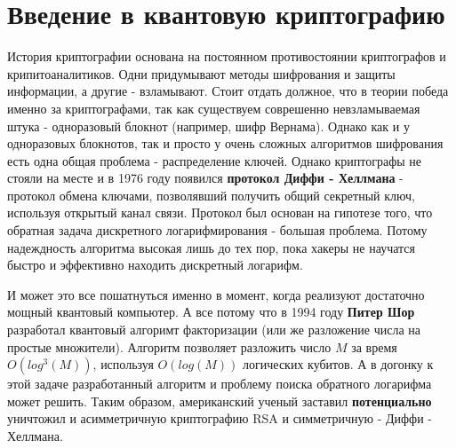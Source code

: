 
\section{Введение в квантовую криптографию}

История криптографии основана на постоянном противостоянии криптографов и крипитоаналитиков. Одни придумывают методы шифрования и защиты информации, а другие - взламывают. 
Стоит отдать должное, что в теории победа именно за криптографами, так как существуем соврешенно невзламываемая штука - одноразовый блокнот (например, шифр Вернама). 
Однако как и у одноразовых блокнотов, так и просто у очень сложных алгоритмов шифрования есть одна общая проблема - распределение ключей.
Однако криптографы не стояли на месте и в 1976 году появился \textbf{протокол Диффи - Хеллмана} -  протокол обмена ключами, позволявший получить общий секретный ключ, используя открытый канал связи. 
Протокол был основан на гипотезе того, что обратная задача дискретного логарифмирования - большая проблема. Потому надеждность алгоритма высокая лишь до тех пор, пока хакеры не научатся быстро и эффективно находить дискретный логарифм.

И может это все пошатнуться именно в момент, когда реализуют достаточно мощный квантовый компьютер. А все потому что в 1994 году \textbf{Питер Шор} разработал квантовый алгоримт факторизации (или же разложение числа на простые множители). Алгоритм позволяет разложить число $M$ за время $O(log^{3} (M))$, используя $O(log(M))$ логических кубитов. А в догонку к этой задаче разработанный алгоритм и проблему поиска обратного логарифма может решить. 
Таким образом, американский ученый заставил \textbf{потенциально} уничтожил и асимметричную криптографию RSA и симметричную - Диффи - Хеллмана. 

